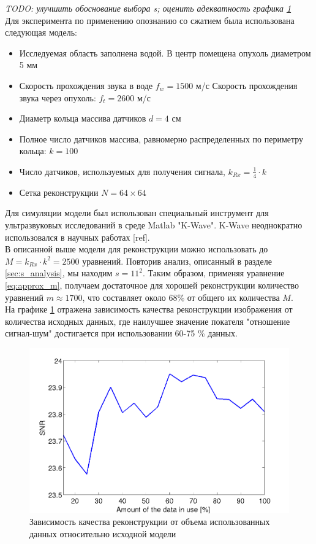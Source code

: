 \documentclass[14pt]{matmex-diploma}
\begin{document}
\textit{TODO: улучшить обоснование выбора s; оценить адекватность графика \ref{fig:used_equations} }\\
Для эксперимента по применению опознанию со сжатием была использована следующая модель:
\begin{itemize}
\item Исследуемая область заполнена водой. В центр помещена опухоль диаметром 5 мм
\item Скорость прохождения звука в воде $f_w = 1500$ м/с Скорость прохождения звука через опухоль: $f_t = 2600$ м/с
\item Диаметр кольца массива датчиков $d = 4 \text{ см}$
\item Полное число датчиков массива, равномерно распределенных по периметру кольца: $k = 100$
\item Число датчиков, используемых для получения сигнала, $k_{Rx} = \frac{1}{4} \cdot k$
\item Сетка реконструкции $N = 64\times 64$
\end{itemize}
Для симуляции модели был использован специальный инструмент для ультразвуковых исследований в среде Matlab "K-Wave". K-Wave неоднократно использовался в научных работах [ref].\\
В описанной выше модели для реконструкции можно использовать до $M = k_{Rx} \cdot k^2 = 2500$ уравнений. Повторив анализ, описанный в разделе \ref{sec:s_analysis}, мы находим $s=11^2$. 
Таким образом, применяя уравнение \eqref{eq:approx_m}, получаем достаточное для хорошей реконструкции количество уравнений $m \approx 1700$, что составляет около 68\% от общего их количества $M$. \\
На графике \ref{fig:used_equations} отражена зависимость качества реконструкции изображения от количества исходных данных, где наилучшее значение покателя "отношение сигнал-шум" достигается при использовании 60-75 \% данных. 

\begin{figure}[h]
\centering
    \includegraphics[width=.7\textwidth]{pics/kwave_snr.png}
    \caption{Зависимость качества реконструкции от объема использованных данных относительно исходной модели}
    \label{fig:used_equations}
\end{figure}
\end{document}
